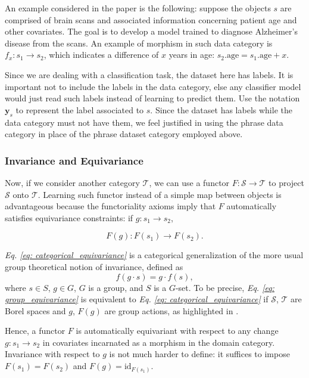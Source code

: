 \documentclass[11pt,a4paper,openright,twoside]{report}
\theoremstyle{plain}
\theoremstyle{definition}
\begin{document}
An example considered in the paper is the following: suppose the objects $s$ are comprised of brain scans and associated information concerning patient age and other covariates. The goal is to develop a model trained to diagnose Alzheimer's disease from the scans. An example of morphism in such data category is $f_x: s_1 \to s_2$, which indicates a difference of $x$ years in age: $s_2.\mathrm{age} = s_1.\mathrm{age} + x$.


Since we are dealing with a classification task, the dataset here has labels. It is important not to include the labels in the data category, else any classifier model would just read such labels instead of learning to predict them. Use the notation $\mathbf{y}_s$ to represent the label associated to $s$. Since the dataset has labels while the data category must not have them, we feel justified in using the phrase data category in place of the phrase dataset category employed above.


\subsubsection{Invariance and Equivariance}


Now, if we consider another category $\mathcal{T}$, we can use a functor $F: \mathcal{S} \to \mathcal{T}$ to project $\mathcal{S}$ onto $\mathcal{T}$. Learning such functor instead of a simple map between objects is advantageous because the functoriality axioms imply that $F$ automatically satisfies equivariance constraints: if $g: s_1 \to s_2$,

\begin{equation}
  \label{eq: categorical_equivariance}
  F(g): F(s_1) \to F(s_2).
\end{equation}

\textit{Eq. \ref{eq: categorical_equivariance}} is a categorical generalization of the more usual group theoretical notion of invariance, defined as
\begin{equation}
  \label{eq: group_equivariance}
  f(g \cdot s) = g \cdot f(s),
\end{equation}
where $s \in S$, $g \in G$, $G$ is a group, and $S$ is a $G$-set. To be precise, \textit{Eq. \ref{eq: group_equivariance}} is equivalent to \textit{Eq. \ref{eq: categorical_equivariance}} if $\mathcal{S}$, $\mathcal{T}$ are Borel spaces and $g$, $F(g)$ are group actions, as highlighted in \cite{chytasPoolingImageDatasets2024}.


Hence, a functor $F$ is automatically equivariant with respect to any change $g: s_1 \to s_2$ in covariates incarnated as a morphism in the domain category. Invariance with respect to $g$ is not much harder to define: it suffices to impose $F(s_1) = F(s_2)$ and $F(g) = \mathrm{id}_{F(s_1)}$.
\end{document}
